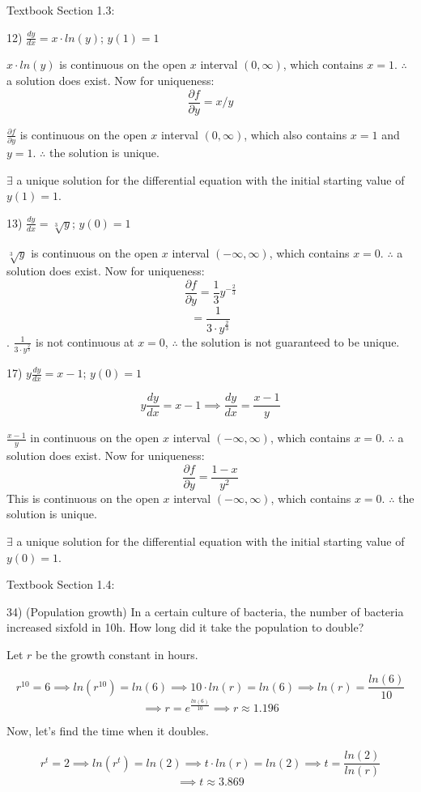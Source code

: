 \documentclass{article}
\begin{document}
Textbook Section 1.3:

12) $\frac{dy}{dx} = x \cdot ln(y)$; $y(1) = 1$

$x \cdot ln(y)$ is continuous on the open $x$ interval $(0, \infty)$,
which contains $x = 1$.
$\therefore$ a solution does exist.
Now for uniqueness:
\[\frac{\partial f}{\partial y} = x/y\]

$\frac{\partial f}{\partial y}$ is continuous on the open $x$ interval
$(0, \infty)$, which also contains $x = 1$ and $y = 1$.
$\therefore$ the solution is unique.

$\exists$ a unique solution for the differential equation with
the initial starting value of $y(1) = 1$.


13) $\frac{dy}{dx} = \sqrt[3]{y}$; $y(0) = 1$

$\sqrt[3]{y}$ is continuous on the open $x$ interval $(-\infty, \infty)$,
which contains $x = 0$.
$\therefore$ a solution does exist.
Now for uniqueness:
\[\frac{\partial f}{\partial y} = \frac{1}{3}y^{-\frac{2}{3}}\]
\[= \frac{1}{3 \cdot y^{\frac{2}{3}}}\].
$\frac{1}{3 \cdot y^{\frac{2}{3}}}$ is not continuous at $x = 0$,
$\therefore$ the solution is not guaranteed to be unique.


17) $y \frac{dy}{dx} = x-1$; $y(0) = 1$

\[y \frac{dy}{dx} = x-1
\implies \frac{dy}{dx} = \frac{x-1}{y}\]

$\frac{x-1}{y}$ in continuous on the open $x$ interval $(-\infty, \infty)$,
which contains $x = 0$.
$\therefore$ a solution does exist.
Now for uniqueness:
\[\frac{\partial f}{\partial y} = \frac{1-x}{y^2}\]
This is continuous on the open $x$ interval $(-\infty, \infty)$,
which contains $x = 0$.
$\therefore$ the solution is unique.

$\exists$ a unique solution for the differential equation with
the initial starting value of $y(0) = 1$.


Textbook Section 1.4:

34) (Population growth) In a certain culture of bacteria, the number
of bacteria increased sixfold in 10h. How long did it take the
population to double?

Let $r$ be the growth constant in hours.

\[r^{10} = 6
\implies ln(r^{10}) = ln(6)
\implies 10 \cdot ln(r) = ln(6)
\implies ln(r) = \frac{ln(6)}{10}\]
\[\implies r = e^{\frac{ln(6)}{10}}
\implies r \approx 1.196\]

Now, let's find the time when it doubles.

\[r^t = 2
\implies ln(r^t) = ln(2)
\implies t \cdot ln(r) = ln(2)
\implies t = \frac{ln(2)}{ln(r)}\]
\[\implies t \approx 3.869\]
\end{document}
